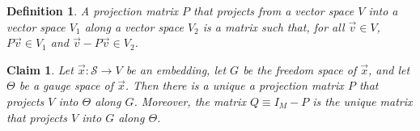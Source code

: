 \documentclass{article}
\numberwithin{myclaim}{section}
\newtheorem{claim}{Claim}
\newtheorem{definition}{Definition}
\begin{document}
\begin{definition} \label{def:projection}
A projection matrix $P$ that projects from a vector space $V$ into a vector space $V_1$ along a vector space $V_2$ is a matrix such that, for all $\vec{v} \in V$, $P \vec{v} \in V_1$ and $\vec{v} - P \vec{v} \in V_2$.     
\end{definition}

\begin{claim}
Let $\vec{x}:\mathcal{S} \to V$ be an embedding, let $G$ be the freedom space of $\vec{x}$, and let $\Theta$ be a gauge space of $\vec{x}$. Then there is a unique a projection matrix $P$ that projects $V$ into $\Theta$ along $G$. Moreover, the matrix $Q \equiv I_M - P$ is the unique matrix that projects $V$ into $G$ along $\Theta$.  
\end{claim}
\end{document}
